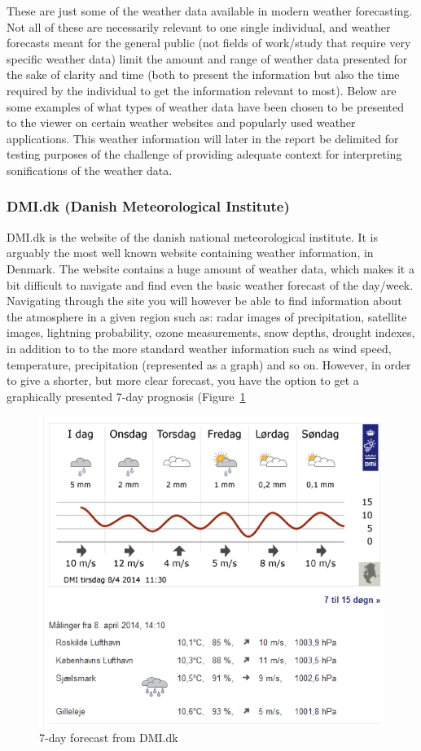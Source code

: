 These are just some of the weather data available in modern weather forecasting. 
Not all of these are necessarily relevant to one single individual, and weather forecasts meant for the general public (not fields of work/study that require very specific weather data) limit the amount and range of weather data presented for the sake of clarity and time (both to present the information but also the time required by the individual to get the information relevant to most). 
Below are some examples of what types of weather data have been chosen to be presented to the viewer on certain weather websites and popularly used weather applications. 
This weather information will later in the report be delimited for testing purposes of the challenge of providing adequate context for interpreting sonifications of the weather data.


\FloatBarrier
\subsubsection*{DMI.dk (Danish Meteorological Institute)} %
\label{ssub:dmi_dk_danish_meteorological_institute_}

DMI.dk is the website of the danish national meteorological institute. 
It is arguably the most well known website containing weather information, in Denmark. 
The website contains a huge amount of weather data, which makes it a bit difficult to navigate and find even the basic weather forecast of the day/week. 
Navigating through the site you will however be able to find information about the atmosphere in a given region such as: radar images of precipitation, satellite images, lightning probability, ozone measurements, snow depths, drought indexes, in addition to to the more standard weather information such as wind speed, temperature, precipitation (represented as a graph) and so on. 
However, in order to give a shorter, but more clear forecast, you have the option to get a graphically presented 7-day prognosis (Figure~\ref{fig:dmi1}

\begin{figure}[!htbp]
     \centering
     \includegraphics[width=.75\textwidth]{images/Dmi1.png}
     \caption{7-day forecast from DMI.dk}
     \label{fig:dmi1}
 \end{figure}

